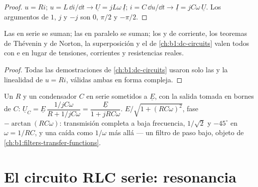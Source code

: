 \begin{proof}
$u = Ri$; $u = L\,\dd i/\dd t \to \underline U = jL\omega\,\underline I$;
$i = C\,\dd u/\dd t \to \underline I = jC\omega\,\underline U$. Los
argumentos de $1$, $j$ y $-j$ son $0$, $\pi/2$ y $-\pi/2$.
\end{proof}

\begin{proposition}\label{prop:b1:sinusoidal-impedance:assoc}
Las  en serie se suman; las  en paralelo se suman;
los  y de corriente, los teoremas de Thévenin y de
Norton, la superposición y el  de
\cref{ch:b1:dc-circuits} valen todos con  e
 en lugar de tensiones, corrientes y resistencias reales.
\end{proposition}

\begin{proof}
Todas las demostraciones de \cref{ch:b1:dc-circuits} usaron solo las  y la linealidad de $u = Ri$, válidas ambas en forma compleja.
\end{proof}

\begin{example}[El divisor RC]\label{ex:b1:sinusoidal-impedance:rcdivider}
Un  $R$ y un condensador $C$ en serie sometidos a $\underline E$,
con la salida tomada en bornes de $C$: $\underline U_C = \underline E\,\dfrac{1/jC\omega}
{R + 1/jC\omega} = \dfrac{\underline E}{1 + jRC\omega}$. 
$E/\sqrt{1 + (RC\omega)^2}$, fase $-\arctan(RC\omega)$: transmisión
completa a baja frecuencia, $1/\sqrt2$ y $-45^\circ$ en
$\omega = 1/RC$, y una caída como $1/\omega$ más allá --- un filtro de
paso bajo, objeto de \cref{ch:b1:filters-transfer-functions}.
\end{example}

\section{El circuito RLC serie: resonancia}

